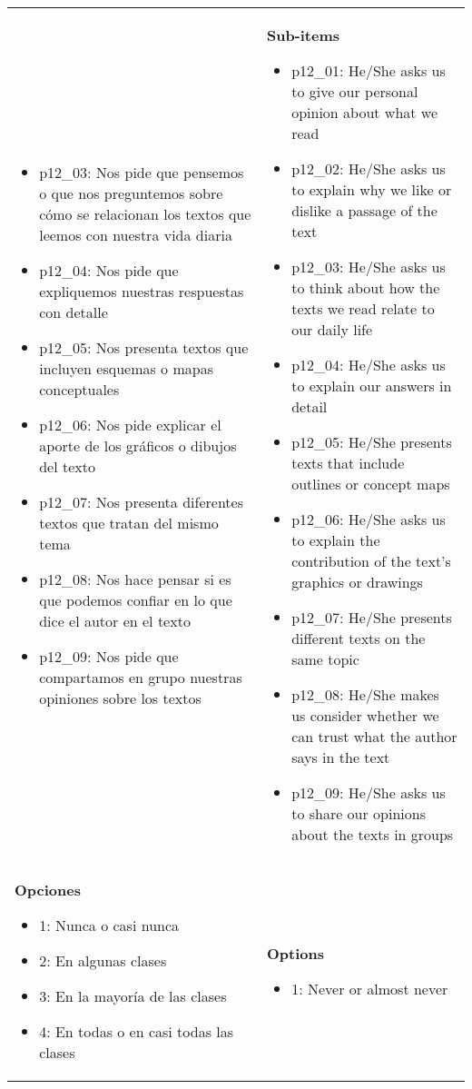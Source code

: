 \documentclass[11pt]{article}
\begin{document}
\begin{longtable}{@{}LL@{}}
\begin{itemize}[leftmargin=*]
\item p12\_03: Nos pide que pensemos o que nos preguntemos sobre cómo se relacionan los textos que leemos con nuestra vida diaria
\item p12\_04: Nos pide que expliquemos nuestras respuestas con detalle
\item p12\_05: Nos presenta textos que incluyen esquemas o mapas conceptuales
\item p12\_06: Nos pide explicar el aporte de los gráficos o dibujos del texto
\item p12\_07: Nos presenta diferentes textos que tratan del mismo tema
\item p12\_08: Nos hace pensar si es que podemos confiar en lo que dice el autor en el texto
\item p12\_09: Nos pide que compartamos en grupo nuestras opiniones sobre los textos\end{itemize} & \textbf{Sub-items}\par\begin{itemize}[leftmargin=*]\item p12\_01: He/She asks us to give our personal opinion about what we read
\item p12\_02: He/She asks us to explain why we like or dislike a passage of the text
\item p12\_03: He/She asks us to think about how the texts we read relate to our daily life
\item p12\_04: He/She asks us to explain our answers in detail
\item p12\_05: He/She presents texts that include outlines or concept maps
\item p12\_06: He/She asks us to explain the contribution of the text's graphics or drawings
\item p12\_07: He/She presents different texts on the same topic
\item p12\_08: He/She makes us consider whether we can trust what the author says in the text
\item p12\_09: He/She asks us to share our opinions about the texts in groups\end{itemize} \\
\textbf{Opciones}\par\begin{itemize}[leftmargin=*]\item 1: Nunca o casi nunca
\item 2: En algunas clases
\item 3: En la mayoría de las clases
\item 4: En todas o en casi todas las clases\end{itemize} & \textbf{Options}\par\begin{itemize}[leftmargin=*]\item 1: Never or almost never

\end{itemize}
\end{longtable}
\end{document}
